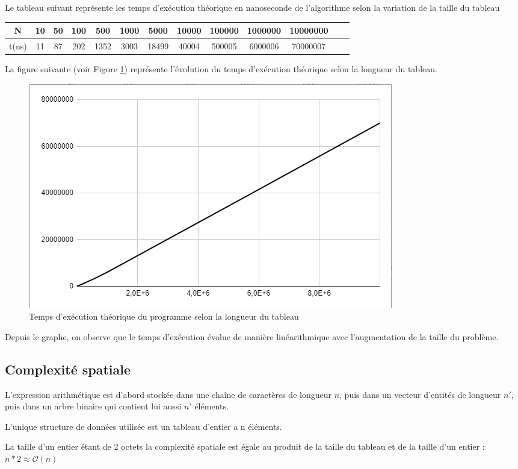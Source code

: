 Le tableau suivant représente les temps d'exécution théorique en nanoseconde de l'algorithme selon la variation de la taille du tableau

\small
\begin{center}
\begin{tabular}{| c | c | c | c | c | c | c | c | c | c | c | c | c |}
    \hline
    N &  10 & 50 & 100 & 500 & 1000 & 5000 & 10000 & 100000 & 1000000 & 10000000 \\
    \hline
    t(ns) & 11 & 87 & 202 & 1352 & 3003 & 18499 & 40004 & 500005 & 6000006 & 70000007 \\
    \hline
\end{tabular}  
\end{center}

La figure suivante (voir Figure \ref{fig:temps_exec_dico_theo}) représente l'évolution du temps d'exécution théorique selon la longueur du tableau.

\begin{figure}[H]
    \centering
        \includegraphics[scale=0.5]{./ressources/tempsexecutiondicotheorique.png}
        \caption{Temps d'exécution théorique du programme selon la longueur du tableau}
    \label{fig:temps_exec_dico_theo}
\end{figure} 

Depuis le graphe,  on observe que le temps d'exécution évolue de manière linéarithmique avec l'augmentation de la taille du problème.

\subsection{Complexité spatiale}
L'expression arithmétique est d'abord stockée dans une chaîne de caractères de longueur $n$, puis dans un vecteur d'entités de longueur $n'$, puis dans un arbre binaire qui contient lui aussi $n'$ éléments.
\par
L'unique structure de données utilisée est un tableau d'entier a n éléments. 
\par
La taille d'un entier étant de 2 octets la complexité spatiale est égale au produit de la taille du tableau et de la taille d'un entier : $n * 2 \approx \mathcal{O}(n)$
\par

